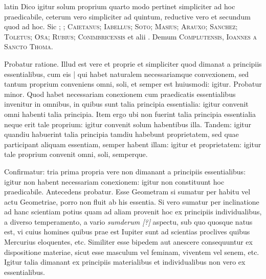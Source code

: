 \begin{otherlanguage*}{latin}
\pstart
Dico igitur solum proprium quarto modo pertinet simpliciter ad hoc praedicabile, ceterum vero simpliciter ad quintum, reductive vero et secundum quod ad hoc. Sic ; ; \textsc{Caietanus}; \textsc{Iabellus}; \textsc{Soto}; \textsc{Masius}; \textsc{Arauxo}; \textsc{Sanchez}; \textsc{Toletus}; \textsc{Oña}; \textsc{Rubius}; \textsc{Conimbricensis}\index[persons]{} et alii . Demum \textsc{Complutensis}\index[persons]{}, \textsc{Ioannes a Sancto Thoma}\index[persons]{}. 
\pend

\pstart
Probatur ratione. Illud est vere et proprie et simpliciter quod dimanat a principiis essentialibus, cum eis \textnormal{|} qui habet naturalem necessariamque convexionem, sed tantum proprium conveniens omni, soli, et semper est huiusmodi:
igitur. Probatur minor. Quod habet necessariam conexionem cum praedicatis essentialibus invenitur in omnibus, in quibus sunt talia principia essentialia:
igitur convenit omni habenti talia principia. Item ergo ubi non fuerint talia principia essentialia neque erit tale proprium:
igitur convenit solum habentibus illa. Tandem:
igitur quandiu habuerint talia principia tamdiu habebunt proprietatem, sed quae participant aliquam essentiam, semper habent illam:
igitur et proprietatem:
igitur tale proprium convenit omni, soli, semperque. 
\pend

\pstart
Confirmatur:
tria prima propria vere non dimanant a principiis essentialibus:
igitur non habent necessariam conexionem:
igitur non constituunt hoc praedicabile. Antecedens probatur. Esse Geometram si sumatur per habitu vel actu Geometriae, porro non fluit ab his essentia. Si vero sumatur per inclinatione ad hanc scientiam potius quam ad aliam provenit hoc ex principiis individualibus, a diverso temperamento, a vario \emph{sumderum [?]} aspectu, sub quo quosque natus est, vi cuius homines quibus prae est Iupiter sunt ad scientias proclives quibus Mercurius eloquentes, etc. Similiter esse bipedem aut anescere consequuntur ex dispositione materiae, sicut esse masculum vel feminam, viventem vel senem, etc. Igitur talia dimanant ex principiis materialibus et individualibus non vero ex essentialibus. 
\pend


\end{otherlanguage*}
